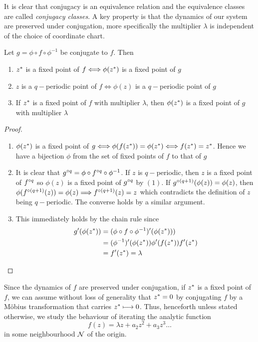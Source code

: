 \documentclass[../main.tex]{subfiles}
\begin{document}
It is clear that conjugacy is an equivalence relation and the equivalence classes are called \emph{conjugacy classes}. A key property is that the dynamics of our system are preserved under conjugation, more specifically the multiplier $\lambda$ is independent of the choice of coordinate chart.

\begin{lem}
Let $g = \phi \circ f \circ \phi^{-1}$ be conjugate to $f$. Then
\begin{enumerate}
    \item $z^*$ is a fixed point of $f \Longleftrightarrow \phi(z^*)$ is a fixed point of $g$
    \item $z$ is a $q-$periodic point of $f \Longleftrightarrow \phi(z)$ is a $q-$periodic point of $g$
    \item If $z^*$ is a fixed point of $f$ with multiplier $\lambda$, then $\phi(z^*)$ is a fixed point of $g$ with multiplier $\lambda$
\end{enumerate}
\end{lem}
\begin{proof}
\begin{enumerate}
    \item $\phi(z^*)$ is a fixed point of $g \Longleftrightarrow \phi(f(z^*)) = \phi(z^*) \Longleftrightarrow f(z^*) = z^*$. Hence we have a bijection $\phi$ from the set of fixed points of $f$ to that of $g$
    \item It is clear that $g^{\circ q} = \phi \circ f^{\circ q} \circ \phi^{-1}$. If $z$ is $q-$periodic, then $z$ is a fixed point of $f^{\circ q}$ so $\phi(z)$ is a fixed point of $g^{\circ q}$ by $(1)$. If $g^{\circ(q+1)}(\phi(z)) = \phi(z)$, then $\phi(f^{\circ(q+1)}(z)) = \phi(z) \Longrightarrow f^{\circ(q+1)}(z) = z$ which contradicts the definition of $z$ being $q-$periodic. The converse holds by a similar argument.
    \item This immediately holds by the chain rule since 
    \begin{align*}
        g^{\prime}(\phi(z^*)) &= (\phi \circ f \circ \phi^{-1})^{\prime}(\phi(z^*)))\\
        &= (\phi^{-1})^{\prime}(\phi(z^*))\phi^{\prime}(f(z^*))f^{\prime}(z^*)\\
        &= f^{\prime}(z^*) = \lambda
    \end{align*}
    \end{enumerate}
\end{proof}

Since the dynamics of $f$ are preserved under conjugation, if $z^*$ is a fixed point of $f$, we can assume without loss of generality that $z^* = 0$ by conjugating $f$ by a M\"obius transformation that carries $z^* \longmapsto 0$. Thus, henceforth unless stated otherwise, we study the behaviour of iterating the analytic function
\begin{equation}
    \label{intro:eq:f}
    f(z)= \lambda z + a_2 z^2 + a_{3} z^3 \dots
\end{equation}
in some neighbourhood $\mathcal{N}$ of the origin.
\end{document}
